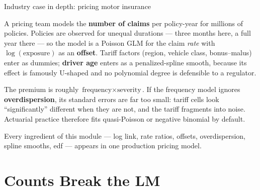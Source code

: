 \documentclass[aspectratio=169,11pt]{beamer}
\begin{document}
\begin{frame}{Industry case in depth: pricing motor insurance}
  \footnotesize
  \begin{industry}
    A pricing team models the \textbf{number of claims} per policy-year for millions of
    policies. Policies are observed for unequal durations --- three months here, a full
    year there --- so the model is a Poisson GLM for the claim \emph{rate} with
    $\log(\text{exposure})$ as an \textbf{offset}. Tariff factors (region, vehicle class,
    bonus--malus) enter as dummies; \textbf{driver age} enters as a penalized-spline smooth,
    because its effect is famously U-shaped and no polynomial degree is defensible to a regulator.
  \end{industry}
  \begin{readme}
    The premium is roughly $\text{frequency}\times\text{severity}$. If the frequency model
    ignores \textbf{overdispersion}, its standard errors are far too small: tariff cells look
    ``significantly'' different when they are not, and the tariff fragments into noise.
    Actuarial practice therefore fits quasi-Poisson or negative binomial by default.
  \end{readme}
  \begin{takeaway}
    Every ingredient of this module --- log link, rate ratios, offsets, overdispersion,
    spline smooths, edf --- appears in one production pricing model.
  \end{takeaway}
\end{frame}

\section{Counts Break the LM}
\end{document}
